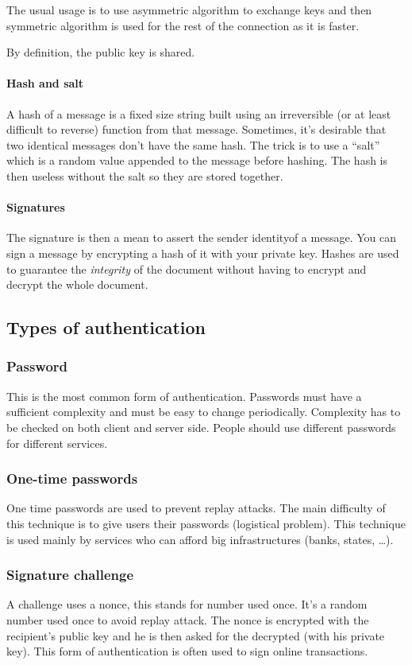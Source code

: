 The usual usage is to use asymmetric algorithm to exchange keys and then
symmetric algorithm is used for the rest of the connection as it is faster.

By definition, the public key is shared.

\paragraph{Hash and salt}
A hash of a message is a fixed size string built using an irreversible
(or at least difficult to reverse) function from that
message. Sometimes, it's desirable that two identical messages don't
have the same hash. The trick is to use a ``salt'' which is a random
value appended to the message before hashing. The hash is then useless
without the salt so they are stored together.

\paragraph{Signatures}
The signature is then a mean to assert the sender identityof a
message.
You can sign a message by encrypting a hash of it with your private key.
 Hashes are used to guarantee the \emph{integrity} of the document
 without having to encrypt and decrypt the whole document.

\subsection{Types of authentication}

\subsubsection{Password}
This is the most common form of authentication.
Passwords must have a sufficient complexity and must be easy to change
periodically.
Complexity has to be checked on both client and server side.
People should use different passwords for different services.

\subsubsection{One-time passwords}
One time passwords are used to prevent replay attacks.
The main difficulty of this technique is to give users their passwords
(logistical problem).
This technique is used mainly by services who can afford big infrastructures
(banks, states, \ldots).

\subsubsection{Signature challenge}
A challenge uses a nonce, this stands for number used once.
It's a random number used once to avoid replay attack.
The nonce is encrypted with the recipient's public key and he is then
asked for the decrypted (with his private key).
This form of authentication is often used to sign online transactions.

